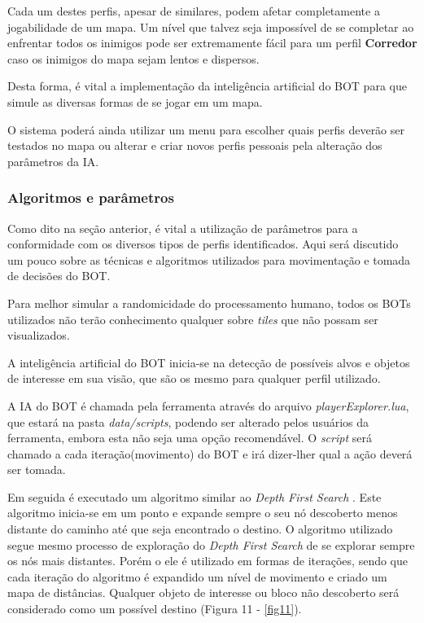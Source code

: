 Cada um destes perfis, apesar de similares, podem afetar completamente a jogabilidade de um mapa. Um nível que talvez seja impossível de se completar ao enfrentar todos os inimigos pode ser extremamente fácil para um perfil \textbf{Corredor} caso os inimigos do mapa sejam lentos e dispersos.

Desta forma, é vital a implementação da inteligência artificial do BOT para que simule as diversas formas de se jogar em um mapa. 

O sistema poderá ainda utilizar um menu para escolher quais perfis deverão ser testados no mapa ou alterar e criar novos perfis pessoais pela alteração dos parâmetros da IA. 

\subsubsection{Algoritmos e parâmetros}

Como dito na seção anterior, é vital a utilização de parâmetros para a conformidade com os diversos tipos de perfis identificados. Aqui será discutido um pouco sobre as técnicas e algoritmos utilizados para movimentação e tomada de decisões do BOT.

Para melhor simular a randomicidade do processamento humano, todos os BOTs utilizados não terão conhecimento qualquer sobre \textit{tiles} que não possam ser visualizados. 

A inteligência artificial do BOT inicia-se na detecção de possíveis alvos e objetos de interesse em sua visão, que são os mesmo para qualquer perfil utilizado.

A IA do BOT é chamada pela ferramenta através do arquivo \textit{playerExplorer.lua}, que estará na pasta \textit{data/scripts}, podendo ser alterado pelos usuários da ferramenta, embora esta não seja uma opção recomendável. 
O \textit{script} será chamado a cada iteração(movimento) do BOT e irá dizer-lher qual a ação deverá ser tomada.

Em seguida é executado um algoritmo similar ao \textit{Depth First Search} \cite{depthsearch}. Este algoritmo inicia-se em um ponto e expande sempre o seu nó descoberto menos distante do caminho até que seja encontrado o destino. O algoritmo utilizado segue mesmo processo de exploração do \textit{Depth First Search} de se explorar sempre os nós mais distantes. Porém o ele é utilizado em formas de iterações, sendo que cada iteração do algoritmo é expandido um nível de movimento e criado um mapa de distâncias. Qualquer objeto de interesse ou bloco não descoberto será considerado como um possível destino (Figura 11 - \ref{fig11}). 

